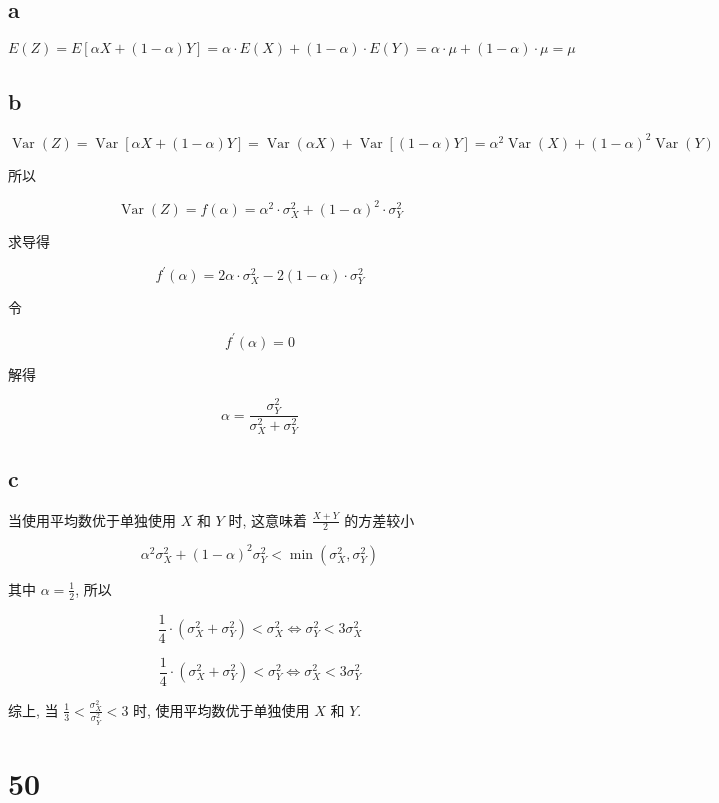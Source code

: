\documentclass[]{article}
\begin{document}
\subsection{a}\label{header-n40}

\[E(Z)=E[\alpha X+(1-\alpha) Y]=\alpha \cdot E(X)+(1-\alpha) \cdot E(Y)=\alpha \cdot \mu+(1-\alpha) \cdot \mu=\mu\]

\subsection{b}\label{header-n42}

\[\operatorname{Var}(Z)=\operatorname{Var}[\alpha X+(1-\alpha) Y]=\operatorname{Var}(\alpha X)+\operatorname{Var}[(1-\alpha) Y]=\alpha^{2}  \operatorname{Var}(X)+(1-\alpha)^{2}  \operatorname{Var}(Y)\]

所以

\[\operatorname{Var}(Z)=f(\alpha)=\alpha^{2} \cdot \sigma_{X}^{2}+(1-\alpha)^{2} \cdot \sigma_{Y}^{2}\]

求导得

\[f^{\prime}(\alpha)=2 \alpha \cdot \sigma_{X}^{2}-2(1-\alpha) \cdot \sigma_{Y}^{2}\]

令

\[f^{\prime}(\alpha)=0\]

解得

\[\alpha=\frac{\sigma_{Y}^{2}}{\sigma_{X}^{2}+\sigma_{Y}^{2}}\]

\subsection{c}\label{header-n52}

当使用平均数优于单独使用 \(X\) 和 \(Y\) 时, 这意味着 \(\frac{X+Y}{2}\)
的方差较小

\[\alpha^{2}\sigma_{X}^{2}+(1-\alpha)^{2} \sigma_{Y}^{2}<\min(\sigma_X^2,\sigma_Y^2)\]

其中 \(\alpha=\frac{1}{2}\), 所以

\[\frac{1}{4} \cdot\left(\sigma_{X}^{2}+\sigma_{Y}^{2}\right)<\sigma_{X}^{2} \Longleftrightarrow \sigma_{Y}^{2}<3 \sigma_{X}^{2}\]

\[\frac{1}{4} \cdot\left(\sigma_{X}^{2}+\sigma_{Y}^{2}\right)<\sigma_{Y}^{2} \Longleftrightarrow \sigma_{X}^{2}<3 \sigma_{Y}^{2}\]

综上, 当 \(\frac{1}{3}<\frac{\sigma_{X}^{2}}{\sigma_{Y}^{2}}<3\) 时,
使用平均数优于单独使用 \(X\) 和 \(Y\).

\section{50}\label{header-n59}
\end{document}
